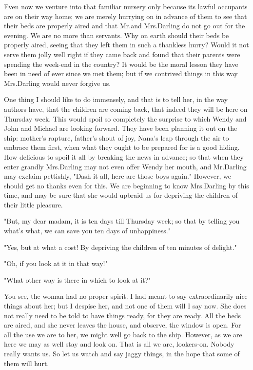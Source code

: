Even now we venture into that familiar nursery only because its lawful occupants are on their way home;
we are merely hurrying on in advance of them to see that their beds are properly aired and that Mr.\@ and Mrs.\@ Darling do not go out for the evening.
We are no more than servants.
Why on earth should their beds be properly aired, seeing that they left them in such a thankless hurry?
Would it not serve them jolly well right if they came back and found that their parents were spending the week-end in the country?
It would be the moral lesson they have been in need of ever since we met them;
but if we contrived things in this way Mrs.\@ Darling would never forgive us.

One thing I should like to do immensely, and that is to tell her, in the way authors have, that the children are coming back, that indeed they will be here on Thursday week.
This would spoil so completely the surprise to which Wendy and John and Michael are looking forward.
They have been planning it out on the ship:
mother's rapture, father's shout of joy, Nana's leap through the air to embrace them first, when what they ought to be prepared for is a good hiding.
How delicious to spoil it all by breaking the news in advance;
so that when they enter grandly Mrs.\@ Darling may not even offer Wendy her mouth, and Mr.\@ Darling may exclaim pettishly, "Dash it all, here are those boys again."
However, we should get no thanks even for this.
We are beginning to know Mrs.\@ Darling by this time, and may be sure that she would upbraid us for depriving the children of their little pleasure.

"But, my dear madam, it is ten days till Thursday week;
so that by telling you what's what, we can save you ten days of unhappiness."

"Yes, but at what a cost!
By depriving the children of ten minutes of delight."

"Oh, if you look at it in that way!"

"What other way is there in which to look at it?"

You see, the woman had no proper spirit.
I had meant to say extraordinarily nice things about her;
but I despise her, and not one of them will I say now.
She does not really need to be told to have things ready, for they are ready.
All the beds are aired, and she never leaves the house, and observe, the window is open.
For all the use we are to her, we might well go back to the ship.
However, as we are here we may as well stay and look on.
That is all we are, lookers-on.
Nobody really wants us.
So let us watch and say jaggy things, in the hope that some of them will hurt.

